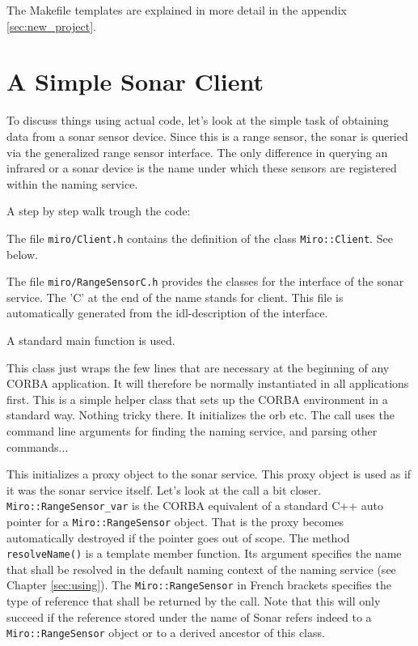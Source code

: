 The Makefile templates are explained in more detail in the appendix
\ref{sec:new_project}.


\section{A Simple Sonar Client}

To discuss things using actual code, let's look at the simple task of
obtaining data from a sonar sensor device. Since this is a range
sensor, the sonar is queried via the generalized range sensor
interface. The only difference in querying an infrared or a sonar
device is the name under which these sensors are registered within the
naming service.


\label{lst:SonarPoll1}

A step by step walk trough the code:



The file \lstinline!miro/Client.h! contains the definition of the class
\lstinline!Miro::Client!. See below.



The file \lstinline!miro/RangeSensorC.h! provides the classes for the interface of the
sonar service. The 'C' at the end of the name stands for client. This
file is automatically generated from the idl-description of the interface.



A standard main function is used.



This class just wraps the few lines that are necessary at the beginning of any CORBA
application. It will therefore be normally instantiated in all \miro
applications first. This is a simple helper class that sets up the
CORBA environment in a standard way. Nothing tricky there.  It
initializes the orb etc. The call uses the command line arguments for
finding the naming service, and parsing other commands...



This initializes a proxy object to the sonar service. This proxy
object is used as if it was the sonar service itself. Let's look
at the call a bit closer. \lstinline!Miro::RangeSensor_var! is the
CORBA equivalent of a standard C++ auto pointer for a
\lstinline!Miro::RangeSensor! object. That is the proxy becomes
automatically destroyed if the pointer goes out of scope. The
method {\tt resolveName()} is a template member function. Its
argument specifies the name that shall be resolved in the default
naming context of the naming service (see Chapter
\ref{sec:using}). The \lstinline!Miro::RangeSensor! in French
brackets specifies the type of reference that shall be returned by
the call. Note that this will only succeed if the reference stored
under the name of Sonar refers indeed to a {\tt Miro::RangeSensor}
object or to a derived ancestor of this class.

